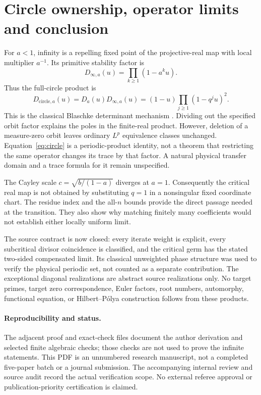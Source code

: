 \section{Circle ownership, operator limits and conclusion}\label{sec:scope}

For $a<1$, infinity is a repelling fixed point of the projective-real map
with local multiplier $a^{-1}$. Its primitive stability factor is
\begin{equation}\label{eq:infinity-factor}
 D_{\infty,a}(u)=\prod_{k\ge1}(1-a^ku).
\end{equation}
Thus the full-circle product is
\begin{equation}\label{eq:circle}
 D_{\mathrm{circle},a}(u)=D_a(u)D_{\infty,a}(u)
 =(1-u)\prod_{j\ge1}(1-q^ju)^2.
\end{equation}
This is the classical Blaschke determinant mechanism
\citep{bandtlow2017spectral}. Dividing out the specified orbit factor explains
the poles in the finite-real product. However, deletion of a measure-zero
orbit leaves ordinary $L^p$ equivalence classes unchanged.
Equation~\eqref{eq:circle} is a periodic-product identity, not a theorem that
restricting the same operator changes its trace by that factor. A natural
physical transfer domain and a trace formula for it remain unspecified.

The Cayley scale $c=\sqrt{b/(1-a)}$ diverges at $a=1$. Consequently the
critical real map is not obtained by substituting $q=1$ in a nonsingular
fixed coordinate chart. The residue index and the all-$n$ bounds provide
the direct passage needed at the transition. They also show why matching
finitely many coefficients would not establish either locally uniform limit.

The source contract is now closed: every iterate weight is explicit, every
subcritical divisor coincidence is classified, and the critical germ has
the stated two-sided compensated limit. Its classical unweighted phase
structure was used to verify the physical periodic set, not counted as a
separate contribution. The exceptional diagonal realizations are abstract
source realizations only. No target primes, target zero correspondence,
Euler factors, root numbers, automorphy, functional equation, or
Hilbert--P\'olya construction follows from these products.

\paragraph{Reproducibility and status.}
The adjacent proof and exact-check files document the author derivation and
selected finite algebraic checks; those checks are not used to prove the
infinite statements. This PDF is an unnumbered research manuscript, not a
completed five-paper batch or a journal submission. The accompanying internal
review and source audit record the actual verification scope. No external
referee approval or publication-priority certification is claimed.
